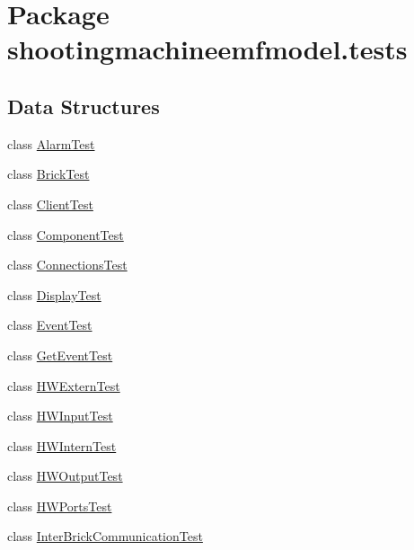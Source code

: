 \hypertarget{namespaceshootingmachineemfmodel_1_1tests}{\section{Package shootingmachineemfmodel.\-tests}
\label{namespaceshootingmachineemfmodel_1_1tests}
}
\subsection*{Data Structures}
\begin{DoxyCompactItemize}
\item 
class \hyperlink{classshootingmachineemfmodel_1_1tests_1_1_alarm_test}{Alarm\-Test}
\item 
class \hyperlink{classshootingmachineemfmodel_1_1tests_1_1_brick_test}{Brick\-Test}
\item 
class \hyperlink{classshootingmachineemfmodel_1_1tests_1_1_client_test}{Client\-Test}
\item 
class \hyperlink{classshootingmachineemfmodel_1_1tests_1_1_component_test}{Component\-Test}
\item 
class \hyperlink{classshootingmachineemfmodel_1_1tests_1_1_connections_test}{Connections\-Test}
\item 
class \hyperlink{classshootingmachineemfmodel_1_1tests_1_1_display_test}{Display\-Test}
\item 
class \hyperlink{classshootingmachineemfmodel_1_1tests_1_1_event_test}{Event\-Test}
\item 
class \hyperlink{classshootingmachineemfmodel_1_1tests_1_1_get_event_test}{Get\-Event\-Test}
\item 
class \hyperlink{classshootingmachineemfmodel_1_1tests_1_1_h_w_extern_test}{H\-W\-Extern\-Test}
\item 
class \hyperlink{classshootingmachineemfmodel_1_1tests_1_1_h_w_input_test}{H\-W\-Input\-Test}
\item 
class \hyperlink{classshootingmachineemfmodel_1_1tests_1_1_h_w_intern_test}{H\-W\-Intern\-Test}
\item 
class \hyperlink{classshootingmachineemfmodel_1_1tests_1_1_h_w_output_test}{H\-W\-Output\-Test}
\item 
class \hyperlink{classshootingmachineemfmodel_1_1tests_1_1_h_w_ports_test}{H\-W\-Ports\-Test}
\item 
class \hyperlink{classshootingmachineemfmodel_1_1tests_1_1_inter_brick_communication_test}{Inter\-Brick\-Communication\-Test}

\end{DoxyCompactItemize}
